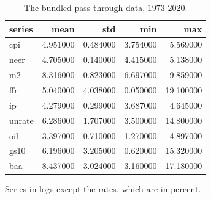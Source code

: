 \begin{table}[htbp]
\centering
\caption{The bundled pass-through data, 1973-2020.}
\label{tab:tab01_data_summary}
\begin{threeparttable}
\begin{tabular}{lrrrr}
\toprule
series & mean & std & min & max \\
\midrule
cpi & 4.951000 & 0.484000 & 3.754000 & 5.569000 \\
neer & 4.705000 & 0.140000 & 4.415000 & 5.138000 \\
m2 & 8.316000 & 0.823000 & 6.697000 & 9.859000 \\
ffr & 5.040000 & 4.038000 & 0.050000 & 19.100000 \\
ip & 4.279000 & 0.299000 & 3.687000 & 4.645000 \\
unrate & 6.286000 & 1.707000 & 3.500000 & 14.800000 \\
oil & 3.397000 & 0.710000 & 1.270000 & 4.897000 \\
gs10 & 6.196000 & 3.205000 & 0.620000 & 15.320000 \\
baa & 8.437000 & 3.024000 & 3.160000 & 17.180000 \\
\bottomrule
\end{tabular}

\begin{tablenotes}[flushleft]\small
\item Series in logs except the rates, which are in percent.
\end{tablenotes}
\end{threeparttable}
\end{table}